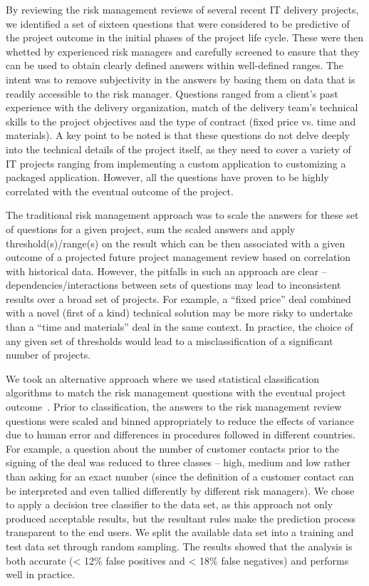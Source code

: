  By reviewing the risk management reviews of several recent IT delivery projects, we identified a set of sixteen questions that were considered to be predictive of the project outcome in the initial phases of the project life cycle. These were then whetted by experienced risk managers and carefully screened to ensure that they can be used to obtain clearly defined answers within well-defined ranges. The intent was to remove subjectivity in the answers by basing them on data that is readily accessible to the risk manager.  Questions ranged from a client's past experience with the delivery organization, match of the delivery team’s technical skills to the project objectives and the type of contract (fixed price vs. time and materials).  A key point to be noted is that these questions do not delve deeply into the technical details of the project itself, as they need to cover a variety of IT projects ranging from implementing a custom application to customizing a packaged application. However, all the questions have proven to be highly correlated with the eventual outcome of the project.

 The traditional risk management approach was to scale the answers for these set of questions for a given project, sum the scaled answers and apply threshold(s)/range(s) on the result which can be then associated with a given outcome of a projected future project management review based on correlation with historical data. However, the pitfalls in such an approach are clear – dependencies/interactions between sets of questions may lead to inconsistent results over a broad set of projects. For example, a “fixed price” deal combined with a novel (first of a kind) technical solution may be more risky to undertake than a “time and materials” deal in the same context. In practice, the choice of any given set of thresholds would lead to a misclassification of a significant number of projects.

 We took an alternative approach where we used statistical classification algorithms to match the risk management questions with the eventual project outcome~\cite{risk28}. Prior to classification, the answers to the risk management review questions were scaled and binned appropriately to reduce the effects of variance due to human error and differences in procedures followed in different countries. For example, a question about the number of customer contacts prior to the signing of the deal was reduced to three classes – high, medium and low rather than asking for an exact number (since the definition of a customer contact can be interpreted and even tallied differently by different risk managers). We chose to apply a decision tree classifier to the data set, as this approach not only produced acceptable results, but the resultant rules make the prediction process transparent to the end users. We split the available data set into a training and test data set through random sampling. The results showed that the analysis is both accurate (< 12\% false positives and < 18\% false negatives) and performs well in practice. 
 
